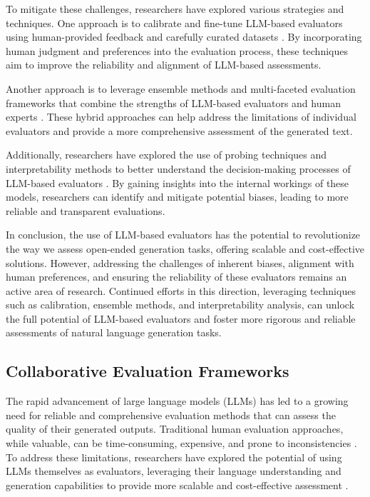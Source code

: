 \documentclass[11pt]{article}
\begin{document}
To mitigate these challenges, researchers have explored various strategies and techniques. One approach is to calibrate and fine-tune LLM-based evaluators using human-provided feedback and carefully curated datasets \cite{ref126,ref107}. By incorporating human judgment and preferences into the evaluation process, these techniques aim to improve the reliability and alignment of LLM-based assessments.

Another approach is to leverage ensemble methods and multi-faceted evaluation frameworks that combine the strengths of LLM-based evaluators and human experts \cite{ref66,ref78}. These hybrid approaches can help address the limitations of individual evaluators and provide a more comprehensive assessment of the generated text.

Additionally, researchers have explored the use of probing techniques and interpretability methods to better understand the decision-making processes of LLM-based evaluators \cite{ref127}. By gaining insights into the internal workings of these models, researchers can identify and mitigate potential biases, leading to more reliable and transparent evaluations.

In conclusion, the use of LLM-based evaluators has the potential to revolutionize the way we assess open-ended generation tasks, offering scalable and cost-effective solutions. However, addressing the challenges of inherent biases, alignment with human preferences, and ensuring the reliability of these evaluators remains an active area of research. Continued efforts in this direction, leveraging techniques such as calibration, ensemble methods, and interpretability analysis, can unlock the full potential of LLM-based evaluators and foster more rigorous and reliable assessments of natural language generation tasks.

\subsection{Collaborative Evaluation Frameworks}

The rapid advancement of large language models (LLMs) has led to a growing need for reliable and comprehensive evaluation methods that can assess the quality of their generated outputs. Traditional human evaluation approaches, while valuable, can be time-consuming, expensive, and prone to inconsistencies \cite{ref128}. To address these limitations, researchers have explored the potential of using LLMs themselves as evaluators, leveraging their language understanding and generation capabilities to provide more scalable and cost-effective assessment \cite{ref129}.
\end{document}
